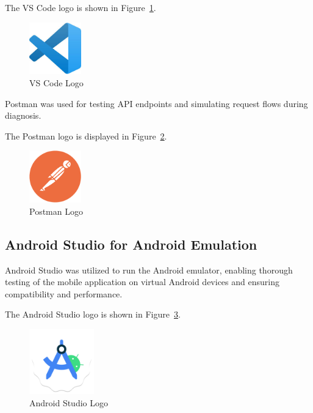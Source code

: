 The VS Code logo is shown in Figure~\ref{fig:vscode_logo}.

\begin{figure}[H]
    \centering
    \includegraphics[width=0.2\textwidth]{images/tools/vscode.png}
    \caption{VS Code Logo}
    \label{fig:vscode_logo}
\end{figure}

Postman was used for testing API endpoints and simulating request flows during diagnosis.

The Postman logo is displayed in Figure~\ref{fig:postman_logo}.

\begin{figure}[H]
    \centering
    \includegraphics[width=0.2\textwidth]{images/tools/postman.png}
    \caption{Postman Logo}
    \label{fig:postman_logo}
\end{figure}

\subsection{Android Studio for Android Emulation}

Android Studio was utilized to run the Android emulator, enabling thorough testing of the mobile application on virtual Android devices and ensuring compatibility and performance.

The Android Studio logo is shown in Figure~\ref{fig:androidstudio_logo}.

\begin{figure}[H]
    \centering
    \includegraphics[width=0.25\textwidth]{images/tools/androidstudio.png}
    \caption{Android Studio Logo}
    \label{fig:androidstudio_logo}
\end{figure}

